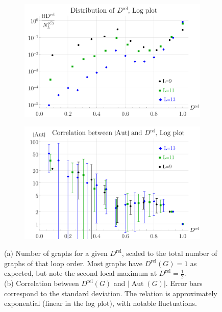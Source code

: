 \documentclass[12pt,a4paper]{article}
\newcommand{\abs}[1]{\lvert #1 \rvert}
\newcommand{\Aut}{\operatorname{Aut}}
\renewcommand{\|}{\rule[-0.4ex]{0.2ex}{1.2em}}
\begin{document}
\begin{figure}[htb]
	\centering
	\begin{subfigure}[b]{.49 \textwidth}
		\includegraphics[width=\textwidth]{Drel_distribution}
		\subcaption{}
		\label{fig:Drel_distribution}
	\end{subfigure}
	\begin{subfigure}[b]{.49 \textwidth}
		\includegraphics[width=\textwidth]{Drel_correlation}
		\subcaption{}
		\label{fig:Drel_correlation}
	\end{subfigure}
	\caption{(a) Number of graphs for a given $D^\text{rel}$, scaled to the  total number of graphs of that loop order. Most graphs have $D^\text{rel}(G)=1$ as expected, but note the second local maximum at $D^\text{rel}=\frac 12$.   \\
	(b) Correlation between $D^\text{rel}(G)$ and $\abs{\Aut(G)}$. Error bars correspond to the standard deviation. The relation is approximately exponential (linear in the log plot), with notable fluctuations. }
	\label{fig:Drel}
\end{figure}
\end{document}
